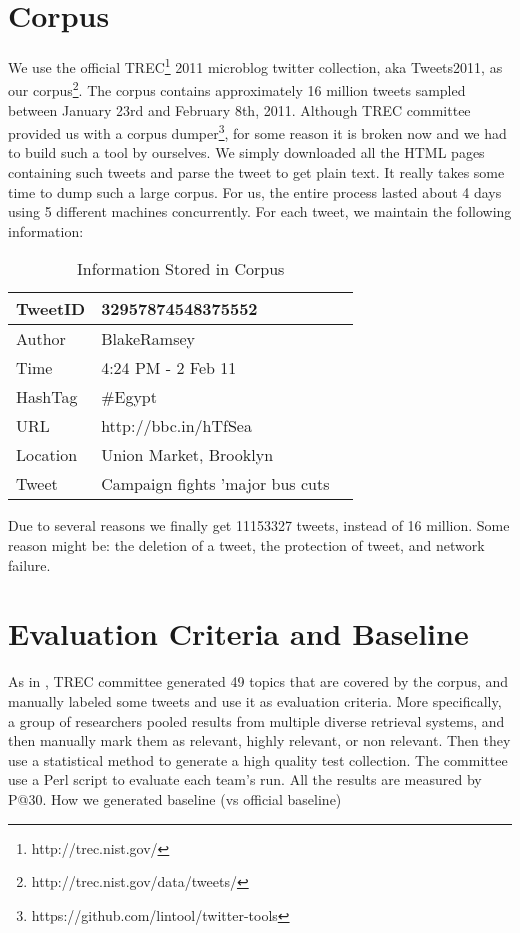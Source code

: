 \documentclass{acm_proc_article-sp}
\begin{document}
\section{Corpus}
We use the official TREC\footnote{http://trec.nist.gov/} 2011 microblog twitter collection, aka Tweets2011, as our corpus\footnote{http://trec.nist.gov/data/tweets/}. The corpus contains approximately 16 million tweets sampled between January 23rd and February 8th, 2011. Although TREC committee provided us with a corpus dumper\footnote{https://github.com/lintool/twitter-tools}, for some reason it is broken now and we had to build such a tool by ourselves. We simply downloaded all the HTML pages containing such tweets and parse the tweet to get plain text. It really takes some time to dump such a large corpus. For us, the entire process lasted about 4 days using 5 different machines concurrently. For each tweet, we maintain the following information:
\begin{table}
\centering
\caption{Information Stored in Corpus}
\begin{tabular}{|l|l|l} \hline
TweetID&32957874548375552\\ \hline
Author&BlakeRamsey\\ \hline
Time&4:24 PM - 2 Feb 11\\ \hline
HashTag& \#Egypt\\ \hline
URL&http://bbc.in/hTfSea\\ \hline
Location&Union Market, Brooklyn\\ \hline
Tweet&Campaign fights 'major bus cuts\\ \hline
\hline\end{tabular}
\end{table}
Due to several reasons we finally get 11153327 tweets, instead of 16 million. Some reason might be: the deletion of a tweet, the protection of tweet, and network failure.

\section{Evaluation Criteria and Baseline}
As in \cite{soboroff2012evaluating}, TREC committee generated 49 topics that are covered by the corpus, and manually labeled some tweets and use it as evaluation criteria. More specifically, a group of researchers pooled results from multiple diverse retrieval systems, and then manually mark them as relevant, highly relevant, or non relevant. Then they use a statistical method \cite{voorhees2005trec} to generate a high quality test collection. The committee use a Perl script to evaluate each team's run. All the results are measured by P@30.
How we generated baseline (vs official baseline)\\
\end{document}
